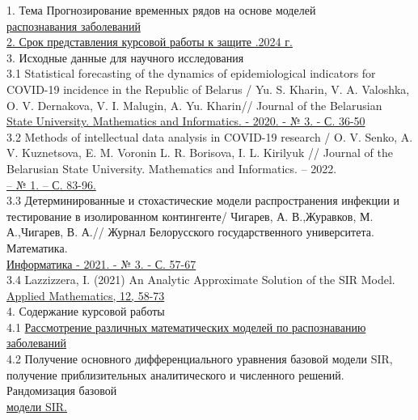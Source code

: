 \documentclass[a4paper, 12pt]{extarticle}
\numberwithin{equation}{section}
\begin{document}
	1. Тема \hspace{3mm} Прогнозирование временных рядов на основе моделей \\
	\hspace*{22mm}\underline{распознавания заболеваний\hspace*{\linegoal}}\\[2mm]
	\underline{2. Срок представления курсовой работы к защите  \quad {}.2024 г.\hspace*{\linegoal}}\\[2mm]
	3. Исходные данные для научного исследования\\[2mm]
	3.1 Statistical forecasting of the dynamics of epidemiological indicators for COVID-19 incidence in the Republic of Belarus / Yu. S. Kharin, V. A. Valoshka, O. V. Dernakova, V. I. Malugin, A. Yu. Kharin// Journal of the Belarusian\\
	\underline{State University. Mathematics and Informatics. - 2020. - № 3. - С. 36-50\hspace*{\linegoal}}\\[2mm]
	3.2 Methods of intellectual data analysis in COVID-19 research / O. V. Senko, A. V. Kuznetsova, E. M. Voronin L. R. Borisova, I. L. Kirilyuk // Journal of the Belarusian State University. Mathematics and Informatics. – 2022.\\
	\underline{  – № 1. – С. 83-96.\hspace*{\linegoal}} \\[2mm]
	3.3 Детерминированные и стохастические модели распространения инфекции и тестирование в изолированном контингенте/ Чигарев, А. В.,Журавков, М. А.,Чигарев, В. А.// Журнал Белорусского государственного университета. Математика.\\
	\underline{Информатика - 2021. - № 3. - С. 57-67\hspace*{\linegoal}}\\[2mm]
	3.4 Lazzizzera, I. (2021) An Analytic Approximate Solution of the SIR Model. \\
	\underline{Applied Mathematics, 12, 58-73\hspace*{\linegoal}}\\[2mm]
	4. Содержание курсовой работы\\[2mm]
	4.1 \underline{Рассмотрение различных математических моделей по распознаванию  заболеваний\hspace*{\linegoal}}\\[2mm]
	4.2 Получение основного дифференциального уравнения базовой модели SIR, получение приблизительных аналитического и численного решений. Рандомизация базовой \\ \underline{модели SIR.\hspace*{\linegoal}}\\[2mm]
\end{document}
